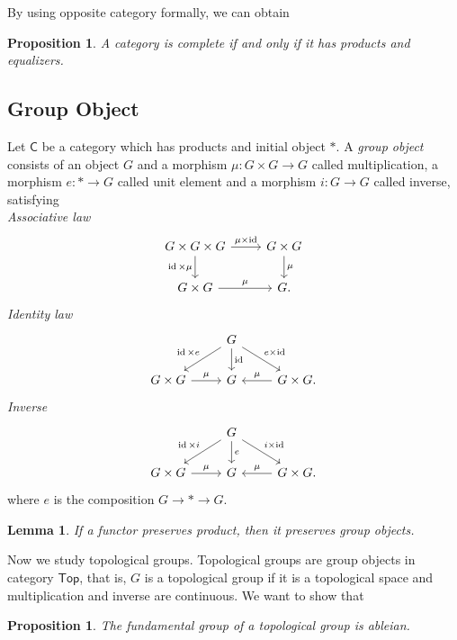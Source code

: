 \documentclass[a4paper]{amsart}
\theoremstyle{plain}
\newtheorem{prop}[thm]{Proposition}
\newtheorem{lem}[thm]{Lemma}
\theoremstyle{definition}
\theoremstyle{remark}
\begin{document}
By using opposite category formally, we can obtain
\begin{prop}
    A category is complete if and only if it has products and equalizers.
\end{prop}

\subsection{Group Object}

Let $\mathsf{C}$ be a category which has products and initial object $*$.
A \emph{group object} consists of an object $G$ and a morphism $\mu:G\times G\to G$ called multiplication, a morphism $e:*\to G$ called unit element and a morphism $i:G\to G$ called inverse, satisfying\\
\emph{Associative law}
\[\begin{tikzcd}
    G\times G\times G \ar[r, "{\mu\times\operatorname{id}}"] \ar[d, "{\operatorname{id}\times\mu}"'] & G\times G \ar[d, "\mu"] \\
    G\times G \ar[r, "\mu"] & G.
\end{tikzcd}\]
\noindent\emph{Identity law}
\[\begin{tikzcd}
     & G \ar[dl, "\operatorname{id}\times e"'] \ar[d, "\operatorname{id}"] \ar[dr, "{e\times\operatorname{id}}"] & \\
    G\times G \ar[r, "\mu"] & G & G\times G. \ar[l, "\mu"']
\end{tikzcd}\]
\noindent\emph{Inverse}
\[\begin{tikzcd}
    & G \ar[dl, "\operatorname{id}\times i"'] \ar[d, "e"] \ar[dr, "{i\times\operatorname{id}}"] & \\
    G\times G \ar[r, "\mu"] & G & G\times G. \ar[l, "\mu"']
\end{tikzcd}\]
where $e$ is the composition $G\to * \to G$.

\begin{lem}
    If a functor preserves product, then it preserves group objects.
\end{lem}

Now we study topological groups.
Topological groups are group objects in category $\mathsf{Top}$, that is, $G$ is a topological group if it is a topological space and multiplication and inverse are continuous.
We want to show that
\begin{prop}\label{top group}
    The fundamental group of a topological group is ableian.
\end{prop}
\end{document}
